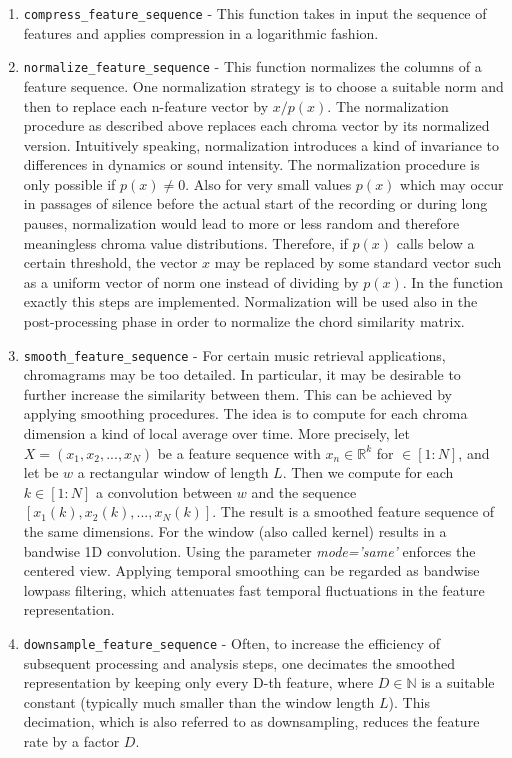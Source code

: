\documentclass[
	12pt, %
]{fphw}
\begin{document}
\begin{enumerate}
	\item \verb|compress_feature_sequence| - This function takes in input the sequence of features and applies compression in a logarithmic fashion.
	\item \verb|normalize_feature_sequence| - This function normalizes the columns of a feature sequence. One normalization strategy is to choose a suitable norm  and then to replace each n-feature vector  by $x/p(x)$. The normalization procedure as described above replaces each chroma vector by its normalized version. Intuitively speaking, normalization introduces a kind of invariance to differences in dynamics or sound intensity. The normalization procedure is only possible if $p(x) \neq 0$. Also for very small values $p(x)$ which may occur in passages of silence before the actual start of the recording or during long pauses, normalization would lead to more or less random and therefore meaningless chroma value distributions. Therefore, if $p(x)$ calls below a certain threshold, the vector $x$ may be replaced by some standard vector such as a uniform vector of norm one instead of dividing by $p(x)$. In the function exactly this steps are implemented. Normalization will be used also in the post-processing phase in order to normalize the chord similarity matrix.
	\item \verb|smooth_feature_sequence| - For certain music retrieval applications, chromagrams may be too detailed. In particular, it may be desirable to further increase the similarity between them. This can be achieved by applying smoothing procedures. The idea is to compute for each chroma dimension a kind of local average over time. More precisely, let \(X=(x_1,x_2,...,x_N)\) be a feature sequence with $x_n \in \mathbb{R}^k$ for $\in[1:N]$, and let be $w$ a rectangular window  of length $L$. Then we compute for each $k \in[1:N]$ a convolution between $w$ and the sequence $[x_1(k),x_2(k),...,x_N(k)]$. The result is a smoothed feature sequence of the same dimensions. For the window (also called kernel) results in a bandwise 1D convolution. Using the parameter \textit{mode='same'} enforces the centered view. Applying temporal smoothing can be regarded as bandwise lowpass filtering, which attenuates fast temporal fluctuations in the feature representation.
	\item \verb|downsample_feature_sequence| - Often, to increase the efficiency of subsequent processing and analysis steps, one decimates the smoothed representation by keeping only every D-th feature, where $D \in \mathbb{N}$ is a suitable constant (typically much smaller than the window length $L$). This decimation, which is also referred to as downsampling, reduces the feature rate by a factor $D$.
\end{enumerate}
\end{document}
